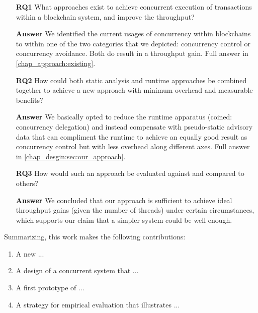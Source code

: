 \begin{enumerate}
	\item [\textbf{RQ1}] What approaches exist to achieve concurrent execution of transactions
	within a blockchain system, and improve the throughput?

	\item [\textbf{Answer}] We identified the current usages of concurrency within blockchains to
	within one of the two categories that we depicted: concurrency control or concurrency avoidance.
	Both do result in a throughput gain. Full answer in \ref{chap_approach:existing}.

	\item [\textbf{RQ2}] How could both static analysis and runtime approaches be combined together
	to achieve a new approach with minimum overhead and measurable benefits?

	\item [\textbf{Answer}] We basically opted to reduce the runtime apparatus (coined: concurrency
	delegation) and instead compensate with pseudo-static advisory data that can compliment the
	runtime to achieve an equally good result as concurrency control but with less overhead along
	different axes. Full answer in \ref{chap_desgin:sec:our_approach}.

	\item [\textbf{RQ3}] How would such an approach be evaluated against and compared to others?

	\item [\textbf{Answer}] We concluded that our approach is sufficient to achieve ideal throughput
	gains (given the number of threads) under certain circumstances, which supports our claim that a
	simpler system could be well enough.
\end{enumerate}

Summarizing, this work makes the following contributions:
\begin{enumerate}
    \item A new ...
    \item A design of a concurrent system that ...
    \item A first prototype of ...
    \item A strategy for empirical evaluation that illustrates ...
\end{enumerate}
